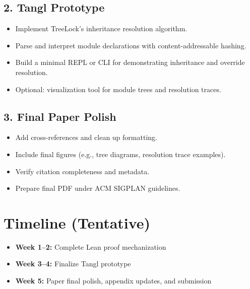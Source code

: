 \documentclass{article}
\begin{document}
\subsection*{2. Tangl Prototype}
\begin{itemize}[label=--]
  \item Implement TreeLock's inheritance resolution algorithm.
  \item Parse and interpret module declarations with content-addressable hashing.
  \item Build a minimal REPL or CLI for demonstrating inheritance and override resolution.
  \item Optional: visualization tool for module trees and resolution traces.
\end{itemize}

\subsection*{3. Final Paper Polish}
\begin{itemize}[label=--]
  \item Add cross-references and clean up formatting.
  \item Include final figures (e.g., tree diagrams, resolution trace examples).
  \item Verify citation completeness and metadata.
  \item Prepare final PDF under ACM SIGPLAN guidelines.
\end{itemize}

\section*{Timeline (Tentative)}
\begin{itemize}[label=--]
  \item \textbf{Week 1–2:} Complete Lean proof mechanization
  \item \textbf{Week 3–4:} Finalize Tangl prototype
  \item \textbf{Week 5:} Paper final polish, appendix updates, and submission
\end{itemize}
\end{document}
